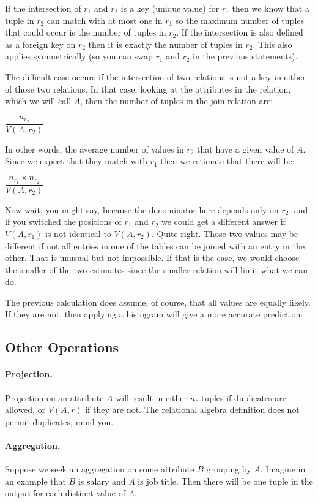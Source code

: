 If the intersection of $r_{1}$ and $r_{2}$ is a key (unique value) for $r_{1}$ then we know that a tuple in $r_{2}$ can match with at most one in $r_{1}$ so the maximum number of tuples that could occur is the number of tuples in $r_{2}$. If the intersection is also defined as a foreign key on $r_{2}$ then it is exactly the number of tuples in $r_{2}$. This also applies symmetrically (so you can swap $r_{1}$ and $r_{2}$ in the previous statements).

The difficult case occurs if the intersection of two relations is not a key in either of those two relations. In that case, looking at the attributes in the relation, which we will call $A$, then the number of tuples in the join relation are:

$\dfrac{n_{r_{2}}}{ V(A, r_{2})} $. 

In other words, the average number of values in $r_{2}$ that have a given value of $A$. Since we expect that they match with $r_{1}$ then we estimate that there will be:

$\dfrac{n_{r_{1}} \times n_{r_{2}}}{ V(A, r_{2})} $. 

Now wait, you might say, because the denominator here depends only on $r_{2}$, and if you switched the positions of $r_{1}$ and $r_{2}$ we could get a different answer if $V(A, r_{1})$ is not identical to $V(A, r_{2})$. Quite right. Those two values may be different if not all entries in one of the tables can be joined with an entry in the other. That is unusual but not impossible. If that is the case, we would choose the smaller of the two estimates since the smaller relation will limit what we can do.

The previous calculation does assume, of course, that all values are equally likely. If they are not, then applying a histogram will give a more accurate prediction. 

\subsection*{Other Operations}

\paragraph{Projection.} Projection on an attribute $A$ will result in either $n_{r}$ tuples if duplicates are allowed, or $V(A, r)$ if they are not. The relational algebra definition does not permit duplicates, mind you.

\paragraph{Aggregation.}
Suppose we seek an aggregation on some attribute $B$ grouping by $A$. Imagine in an example that $B$ is salary and $A$ is job title. Then there will be one tuple in the output for each distinct value of $A$.

